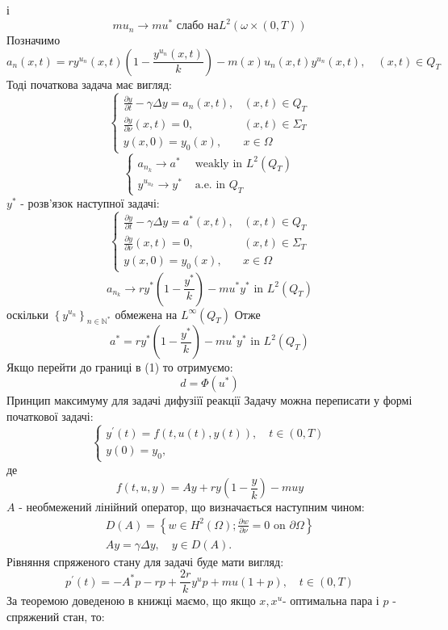 \documentclass[a4paper,12pt]{extreport}
\begin{document}
і 
$$
m u_n \longrightarrow m u^* \text { слабо на} L^2(\omega \times(0, T))
$$
Позначимо 
$$
a_n(x, t)=r y^{u_n}(x, t)\left(1-\frac{y^{u_n}(x, t)}{k}\right)-m(x) u_n(x, t) y^{u_n}(x, t), \quad(x, t) \in Q_T
$$
Тоді початкова задача має вигляд:
$$
\begin{cases}\frac{\partial y}{\partial t}-\gamma \Delta y=a_n(x, t), & (x, t) \in Q_T \\ \frac{\partial y}{\partial \nu}(x, t)=0, & (x, t) \in \Sigma_T \\ y(x, 0)=y_0(x), & x \in \Omega\end{cases}
$$
$$
\begin{cases}a_{n_k} \longrightarrow a^* & \text { weakly in } L^2\left(Q_T\right) \\ y^{u_{n_k}} \longrightarrow y^* & \text { a.e. in } Q_T\end{cases}
$$
$y^*$ - розв'язок наступної задачі:
$$
\begin{cases}\frac{\partial y}{\partial t}-\gamma \Delta y=a^*(x, t), & (x, t) \in Q_T \\ \frac{\partial y}{\partial \nu}(x, t)=0, & (x, t) \in \Sigma_T \\ y(x, 0)=y_0(x), & x \in \Omega\end{cases}
$$
$$
a_{n_k} \longrightarrow r y^*\left(1-\frac{y^*}{k}\right)-m u^* y^* \text { in } L^2\left(Q_T\right)
$$
оскільки $\left\{y^{u_n}\right\}_{n \in \mathbb{N}^*} \text { обмежена на } L^{\infty}\left(Q_T\right)$
Отже $$
a^*=r y^*\left(1-\frac{y^*}{k}\right)-m u^* y^* \text { in } L^2\left(Q_T\right)
$$
Якщо перейти до границі в (1) то отримуємо:
$$
d=\Phi\left(u^*\right)
$$
Принцип максимуму для задачі дифузіїї реакції
Задачу можна переписати у формі початкової задачі:
$$
\left\{\begin{array}{l}
y^{\prime}(t)=f(t, u(t), y(t)), \quad t \in(0, T) \\
y(0)=y_0,
\end{array}\right.
$$
де
$$
f(t, u, y)=A y+r y\left(1-\frac{y}{k}\right)-m u y
$$
$A$ - необмежений лінійний оператор, що визначається наступним чином:
$$
\begin{gathered}
D(A)=\left\{w \in H^2(\Omega) ; \frac{\partial w}{\partial \nu}=0 \text { on } \partial \Omega\right\} \\
A y=\gamma \Delta y, \quad y \in D(A) .
\end{gathered}
$$
Рівняння спряженого стану для задачі буде мати вигляд:
$$
p^{\prime}(t)=-A^* p-r p+\frac{2 r}{k} y^u p+m u(1+p), \quad t \in(0, T)
$$
За теоремою доведеною в книжці маємо, що якщо $x, x^u$- оптимальна пара і $p$ - спряжений стан, то:
\end{document}

